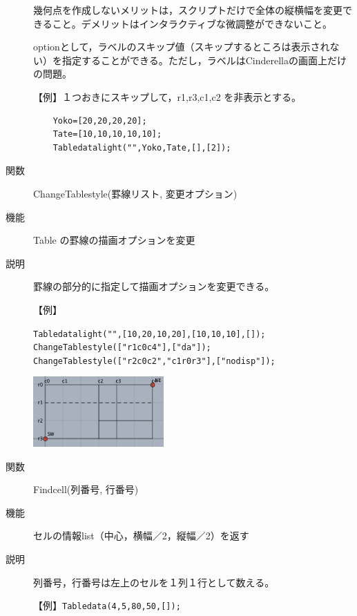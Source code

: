 \documentclass[papersize,a4paper,12pt,uplatex]{jsarticle}
\begin{document}
\begin{description}
幾何点を作成しないメリットは，スクリプトだけで全体の縦横幅を変更できること。デメリットはインタラクティブな微調整ができないこと。
  
optionとして，ラベルのスキップ値（スキップするところは表示されない）を指定することができる。ただし，ラベルはCinderellaの画面上だけの問題。
  
\vspace{\baselineskip}
  【例】１つおきにスキップして，r1,r3,c1,c2 を非表示とする。
\begin{verbatim}
    Yoko=[20,20,20,20];
    Tate=[10,10,10,10,10];
    Tabledatalight("",Yoko,Tate,[],[2]);
\end{verbatim}
        
\vspace{\baselineskip}
\hypertarget{changetablestyle}{}
\item[関数]  ChangeTablestyle(罫線リスト, 変更オプション)
\item[機能]  Table の罫線の描画オプションを変更
\item[説明]  罫線の部分的に指定して描画オプションを変更できる。

\vspace{\baselineskip}
【例】

\verb|Tabledatalight("",[10,20,10,20],[10,10,10],[]);|\\
\verb|ChangeTablestyle(["r1c0c4"],["da"]);|\\
\verb|ChangeTablestyle(["r2c0c2","c1r0r3"],["nodisp"]);|

\vspace{\baselineskip}
\hspace{20mm}\includegraphics[bb=0.00 0.00 324.00 174.00,width=50mm]{Fig/changetable.pdf} 
    
\vspace{\baselineskip}
\hypertarget{findcell}{}
\item[関数]  Findcell(列番号, 行番号)
\item[機能]  セルの情報list（中心，横幅／2，縦幅／2）を返す
\item[説明]  列番号，行番号は左上のセルを１列１行として数える。

\vspace{\baselineskip}
【例】\verb|Tabledata(4,5,80,50,[]);|


\end{description}
\end{document}
